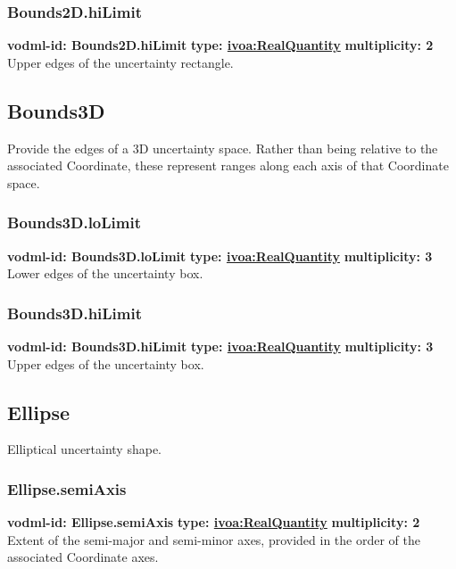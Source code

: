     \subsubsection{Bounds2D.hiLimit}
      \textbf{vodml-id: Bounds2D.hiLimit} \newline
      \textbf{type: \hyperref[sect:ivoa]{ivoa:RealQuantity}} \newline
      \textbf{multiplicity: 2} \newline 
      Upper edges of the uncertainty rectangle.

  \subsection{Bounds3D}
  \label{sect:Bounds3D}
    Provide the edges of a 3D uncertainty space. Rather than being relative to the associated Coordinate, these represent ranges along each axis of that Coordinate space.

    \subsubsection{Bounds3D.loLimit}
      \textbf{vodml-id: Bounds3D.loLimit} \newline
      \textbf{type: \hyperref[sect:ivoa]{ivoa:RealQuantity}} \newline
      \textbf{multiplicity: 3} \newline 
      Lower edges of the uncertainty box.

    \subsubsection{Bounds3D.hiLimit}
      \textbf{vodml-id: Bounds3D.hiLimit} \newline
      \textbf{type: \hyperref[sect:ivoa]{ivoa:RealQuantity}} \newline
      \textbf{multiplicity: 3} \newline 
      Upper edges of the uncertainty box.

  \subsection{Ellipse}
  \label{sect:Ellipse}
    Elliptical uncertainty shape.

    \subsubsection{Ellipse.semiAxis}
      \textbf{vodml-id: Ellipse.semiAxis} \newline
      \textbf{type: \hyperref[sect:ivoa]{ivoa:RealQuantity}} \newline
      \textbf{multiplicity: 2} \newline 
      Extent of the semi-major and semi-minor axes, provided in the order of the associated Coordinate axes.

